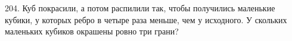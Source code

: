 204. Куб покрасили, а потом распилили так, чтобы получились маленькие кубики, у которых ребро в четыре раза меньше, чем у исходного. У скольких маленьких кубиков окрашены ровно три грани?\\
